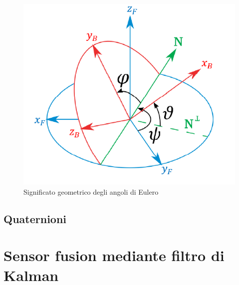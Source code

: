\begin{figure}[H]  
	\centering 
	\includegraphics[scale=0.8]{elaborazione/eulero.png}
	\caption{Significato geometrico degli angoli di Eulero \cite{assetto2}}
	\label{fig:eulero}
\end{figure}














\subsection{Quaternioni }

\section{Sensor fusion mediante  filtro di Kalman}
\label{sensor_fusion}